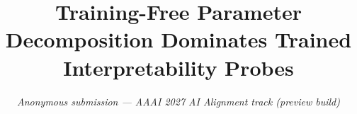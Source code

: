 \documentclass[10pt,letterpaper,twocolumn]{article}
\title{\vspace{-3em}\textbf{Training-Free Parameter Decomposition Dominates Trained Interpretability Probes}\vspace{-1em}}
\author{\textit{Anonymous submission --- AAAI 2027 AI Alignment track (preview build)}}
\date{}
\begin{document}
\twocolumn[
\maketitle
]











\end{document}
